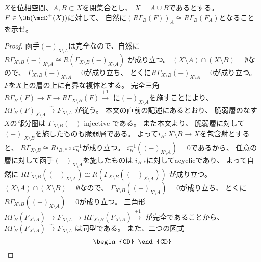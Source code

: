 \documentclass[uplatex,dvipdfmx]{jsarticle}
\begin{document}
\maketitle
\HeaderCommentA
\section{}
\fi

\begin{prob}\label{2.2}
  \(X\)を位相空間、\(A,B\subset X\)を閉集合とし、
  \(X=A\cup B\)であるとする。
  \(F\in \Ob(\mcD^+(X))\)に対して、
  自然に\((R\Gamma_B(F))_A \cong R\Gamma_B(F_A)\)となることを示せ。
\end{prob}

\begin{proof}
  函手\((-)_{X\setminus A}\)は完全なので、自然に
  \(R\Gamma_{X\setminus B}(-)_{X\setminus A}\cong
  R(\Gamma_{X\setminus B}(-)_{X\setminus A})\)
  が成り立つ。
  \((X\setminus A)\cap (X\setminus B) = \emptyset\)なので、
  \(\Gamma_{X\setminus B}(-)_{X\setminus A}=0\)が成り立ち、
  とくに\(R\Gamma_{X\setminus B}(-)_{X\setminus A}=0\)が成り立つ。
  \(F\)を\(X\)上の層の上に有界な複体とする。
  完全三角\(R\Gamma_B(F) \to F\to R\Gamma_{X\setminus B}(F)\xrightarrow{+1}\)
  に\((-)_{X\setminus A}\)を施すことにより、
  \(R\Gamma_B(F)_{X\setminus A}\xrightarrow{\sim}F_{X\setminus A}\)
  が従う。
  本文\cite[Proposition 2.4.10]{kashiwara2002sheaves}の直前の記述にあるとおり、
  脆弱層のなす\(X\)の部分圏は
  \(\Gamma_{X\setminus B}(-)\)-injective
  である。
  また本文\cite[Proposition 2.4.6 (i)]{kashiwara2002sheaves}より、
  脆弱層に対して\((-)|_{X\setminus B}\)を施したものも脆弱層である。
  よって\(i_B:X\setminus B\to X\)を包含射とすると、
  \(R\Gamma_{X\setminus B} \cong Ri_{B,*}\circ i_B^{-1}\)が成り立つ。
  \(i_B^{-1}((-)_{X\setminus A}) = 0\)であるから、
  任意の層に対して函手\((-)_{X\setminus A}\)を施したものは
  \(i_{B,*}\)に対してacyclicであり、
  よって自然に
  \(R\Gamma_{X\setminus B}((-)_{X\setminus A}) \cong
  R(\Gamma_{X\setminus B}((-)_{X\setminus A}))\)
  が成り立つ。
  \((X\setminus A)\cap (X\setminus B) = \emptyset\)なので、
  \(\Gamma_{X\setminus B}((-)_{X\setminus A}) = 0\)が成り立ち、
  とくに\(R\Gamma_{X\setminus B}((-)_{X\setminus A}) = 0\)が成り立つ。
  三角形
  \(R\Gamma_B(F_{X\setminus A})\to F_{X\setminus A}\to
  R\Gamma_{X\setminus B}(F_{X\setminus A})\xrightarrow{+1}\)
  が完全であることから、
  \(R\Gamma_B(F_{X\setminus A})\xrightarrow{\sim} F_{X\setminus A}\)
  は同型である。
  また、二つの図式
  \[
  \begin{CD}

\end{CD}\]
\end{proof}
\end{document}
